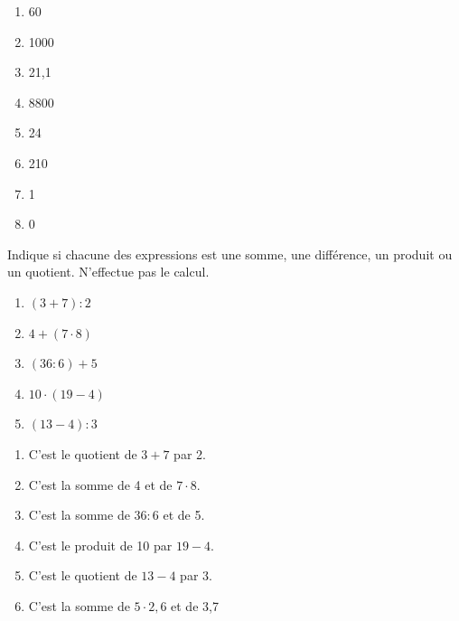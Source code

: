 \documentclass[../../syllabus_1.tex]{subfiles}
\begin{document}
\begin{solution}
    \begin{enumerate}
        \item 60
        \item \num{1000}
        \item 21,1
        \item \num{8800}
        \item 24
        \item 210
        \item 1
        \item 0
    \end{enumerate}
\end{solution}
\begin{exercise}
    Indique si chacune des expressions est une somme, une différence, un produit ou un quotient. N'effectue pas le calcul.

    \begin{enumerate}[cols=2]
        \item \( (3 + 7) : 2 \)
        \item \( 4 +(7 \cdot 8) \)
        \item \( (36 : 6) + 5 \)
        \item \( 10 \cdot (19 - 4) \)
        \item \( (13 - 4) : 3 \)
    \end{enumerate}
\end{exercise}
\begin{solution}
    \begin{enumerate}
        \item C'est le quotient de $3 + 7$ par 2.
        \item C'est la somme de 4 et de $7 \cdot 8$.
        \item C'est la somme de $36 : 6$ et de 5.
        \item C'est le produit de 10 par $19 - 4$.
        \item C'est le quotient de $13 - 4$ par 3.
        \item C'est la somme de $5 \cdot 2,6$ et de 3,7
    \end{enumerate}
\end{solution}
\end{document}
